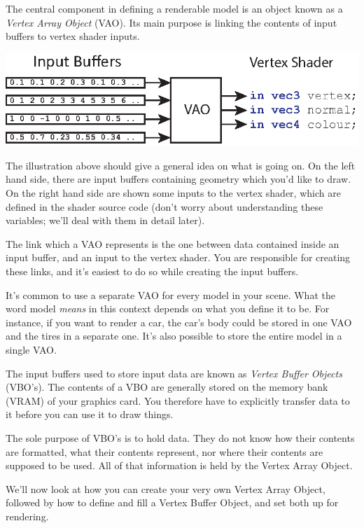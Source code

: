 The central component in defining a renderable model is an object known as a \emph{Vertex Array Object} (VAO). Its main purpose is linking the contents of input buffers to vertex shader inputs.

\begin{center}
\includegraphics{images/vao-overview.eps}
\end{center}

The illustration above should give a general idea on what is going on. On the left hand side, there are input buffers containing geometry which you'd like to draw. On the right hand side are shown some inputs to the vertex shader, which are defined in the shader source code (don't worry about understanding these variables; we'll deal with them in detail later). 

The link which a VAO represents is the one between data contained inside an input buffer, and an input to the vertex shader. You are responsible for creating these links, and it's easiest to do so while creating the input buffers.

It's common to use a separate VAO for every model in your scene. What the word model \emph{means} in this context depends on what you define it to be. For instance, if you want to render a car, the car's body could be stored in one VAO and the tires in a separate one. It's also possible to store the entire model in a single VAO.

The input buffers used to store input data are known as \emph{Vertex Buffer Objects} (VBO's). The contents of a VBO are generally stored on the memory bank (VRAM) of your graphics card. You therefore have to explicitly transfer data to it before you can use it to draw things.

The sole purpose of VBO's is to hold data. They do not know how their contents are formatted, what their contents represent, nor where their contents are supposed to be used. All of that information is held by the Vertex Array Object.

We'll now look at how you can create your very own Vertex Array Object, followed by how to define and fill a Vertex Buffer Object, and set both up for rendering.

